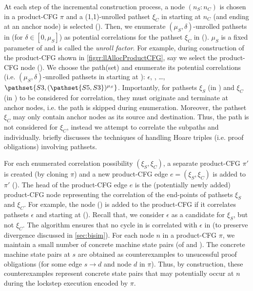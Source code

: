 At each step of the incremental construction process, a node $(n_S \! : \! n_C)$ is chosen in a product-CFG $\pi$
and a (1,1)-unrolled pathset $\xi_C$ in \cprog{} starting at $n_C$ (and ending at an anchor node) is selected ().
Then, we enumerate $(\mu_S,\delta)$-unrolled pathsets in \sprog{} (for $\delta \in [0,\mu_S]$) as potential correlations for
the pathset $\xi_C$ in \cprog{} ().
$\mu_S$ is a fixed parameter of \toolName{} and is called the {\em unroll factor}.
For example, during construction of the product-CFG shown in \cref{figrr:llAllocProductCFG},
say we select the product-CFG node ().
We choose the \cprog{} path(set)  and enumerate its potential correlations (i.e. $(\mu_S,\delta)$-unrolled pathsets in \sprog{} starting at ):
$\epsilon$, , \ldots, $\pathset{S3,(\pathset{S5,S3})^{\mu_S}}$.
Importantly, for pathsets $\xi_S$ (in \sprog{}) and $\xi_C$ (in \cprog{}) to be considered for correlation,
they must originate and terminate at anchor nodes, i.e. the path  is skipped during enumeration.
Moreover, the pathset $\xi_C$ may only contain anchor nodes as its source and destination.
Thus, the path  is not considered for $\xi_C$,
instead we attempt to correlate the subpaths  and  individually.
 briefly discusses the techniques of handling Hoare triples (i.e. proof obligations)
involving pathsets.

For each enumerated correlation possibility $(\xi_S,\xi_C)$, a separate product-CFG $\pi'$ is
created (by cloning $\pi$) and a new product-CFG edge $e=(\xi_S,\xi_C)$ is added to $\pi'$ ().
The head of the product-CFG edge $e$ is the (potentially newly added) product-CFG node representing
the correlation of the end-points of pathsets $\xi_S$ and $\xi_C$. For example, the node () is added
to the product-CFG if it correlates pathsets $\epsilon$ and  starting at ().
Recall that, we consider $\epsilon$ as a candidate for $\xi_S$, but not $\xi_C$.
The algorithm ensures that no cycle in \cprog{} is correlated with $\epsilon$ in \sprog{}
(to preserve divergence discussed in \cref{sec:bisim}).
For each node $n$ in a product-CFG $\pi$, we maintain a small number of
concrete machine state pairs (of \sprog{} and \cprog{}).
The concrete machine state pairs at $s$ are obtained as counterexamples to unsucessful proof
obligations  (for some edge $s \rightarrow d$ and node $d$ in $\pi$).
Thus, by construction, these counterexamples represent concrete state pairs that may potentially occur
at $n$ during the lockstep execution encoded by $\pi$.

